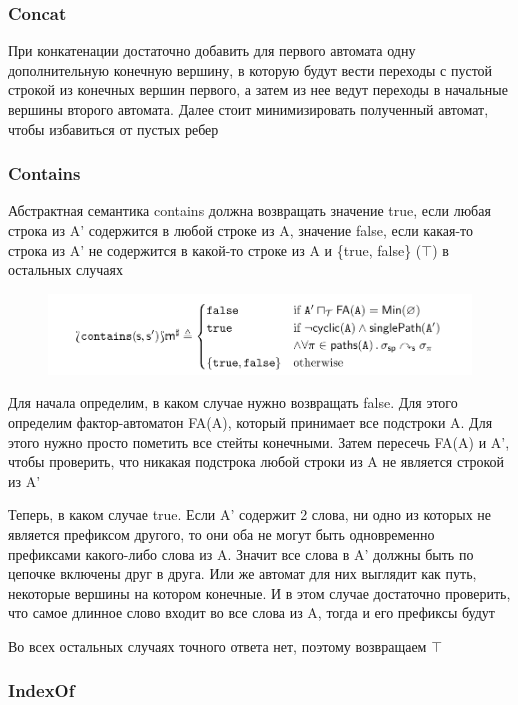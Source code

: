 \subsubsection*{Concat}
При конкатенации достаточно добавить для первого автомата одну дополнительную конечную вершину, в которую будут вести переходы с пустой строкой из конечных вершин первого, а затем из нее ведут переходы в начальные вершины второго автомата. Далее стоит минимизировать полученный автомат, чтобы избавиться от пустых ребер

\newpage
\subsubsection*{Contains}
Абстрактная семантика contains должна возвращать значение true, если любая строка из A' содержится в любой строке из A, значение false, если какая-то строка из A' не содержится в какой-то строке из A и \{true, false\} ($\top$) в остальных случаях
\begin{figure}[H]
\includegraphics[width=\textwidth]{images/tarsis-contains.png}\hfill
\end{figure}
Для начала определим, в каком случае нужно возвращать false. Для этого определим фактор-автоматон FA(A), который принимает все подстроки A. Для этого нужно просто пометить все стейты конечными. Затем пересечь FA(A) и A', чтобы проверить, что никакая подстрока любой строки из A не является строкой из A'

Теперь, в каком случае true. Если A' содержит 2 слова, ни одно из которых не является префиксом другого, то они оба не могут быть одновременно префиксами какого-либо слова из A. Значит все слова в A' должны быть по цепочке включены друг в друга. Или же автомат для них выглядит как путь, некоторые вершины на котором конечные. И в этом случае достаточно проверить, что самое длинное слово входит во все слова из A, тогда и его префиксы будут

Во всех остальных случаях точного ответа нет, поэтому возвращаем $\top$

\newpage
\subsubsection*{IndexOf}

